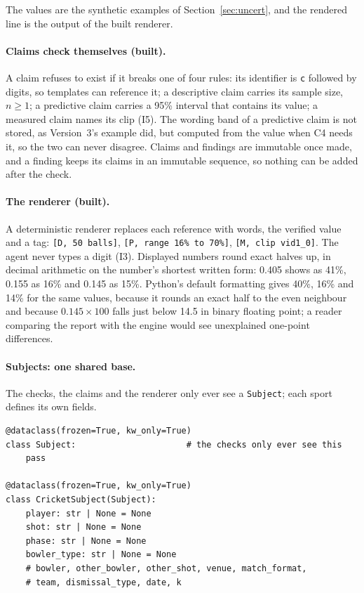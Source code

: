 \documentclass[11pt,a4paper]{article}
\begin{document}
\noindent The values are the synthetic examples of Section~\ref{sec:uncert}, and
the rendered line is the output of the built renderer.

\paragraph{Claims check themselves (built).} A claim refuses to exist if it
breaks one of four rules: its identifier is \texttt{c} followed by digits, so
templates can reference it; a descriptive claim carries its sample size,
$n \geq 1$; a predictive claim carries a 95\% interval that contains its value;
a measured claim names its clip (I5). The wording band of a predictive claim is
not stored, as Version~3's example did, but computed from the value when C4 needs
it, so the two can never disagree. Claims and findings are immutable once made,
and a finding keeps its claims in an immutable sequence, so nothing can be added
after the check.

\paragraph{The renderer (built).} A deterministic renderer replaces each
reference with words, the verified value and a tag: \texttt{[D, 50 balls]},
\texttt{[P, range 16\% to 70\%]}, \texttt{[M, clip vid1\_0]}. The agent never
types a digit (I3). Displayed numbers round exact halves up, in decimal
arithmetic on the number's shortest written form: 0.405 shows as 41\%, 0.155 as
16\% and 0.145 as 15\%. Python's default formatting gives 40\%, 16\% and 14\% for
the same values, because it rounds an exact half to the even neighbour and
because $0.145 \times 100$ falls just below 14.5 in binary floating point; a
reader comparing the report with the engine would see unexplained one-point
differences.

\paragraph{Subjects: one shared base.} The checks, the claims and the renderer
only ever see a \texttt{Subject}; each sport defines its own fields.

\medskip
{\footnotesize
\begin{verbatim}
@dataclass(frozen=True, kw_only=True)
class Subject:                      # the checks only ever see this
    pass

@dataclass(frozen=True, kw_only=True)
class CricketSubject(Subject):
    player: str | None = None
    shot: str | None = None
    phase: str | None = None
    bowler_type: str | None = None
    # bowler, other_bowler, other_shot, venue, match_format,
    # team, dismissal_type, date, k
\end{verbatim}}
\medskip
\end{document}

